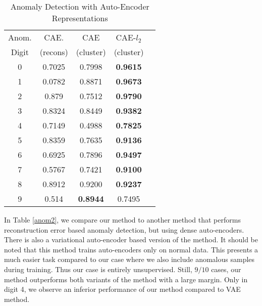 \documentclass[conference]{IEEEtran}
\begin{document}
\begin{table}[!t]

\caption{Anomaly Detection with Auto-Encoder Representations}
\label{anom}
\centering
\centering

\begin{adjustbox}{width=0.35\textwidth}

\begin{tabular}{|c|c|c|c|c|}
\hline
Anom.  & CAE. & CAE & CAE-$l_2$\\ 
Digit  & (recons) & (cluster) & (cluster)\\ 
\hline
0 &  0.7025 & 0.7998 & \textbf{0.9615} \\
\hline
1 &  0.0782 & 0.8871 & \textbf{0.9673}\\
\hline
2 &  0.879 & 0.7512 & \textbf{0.9790}\\
\hline
3 & 0.8324 & 0.8449 & \textbf{0.9382}\\
\hline
4 & 0.7149 & 0.4988 & \textbf{0.7825}\\
\hline
5 &  0.8359 & 0.7635 & \textbf{0.9136}\\
\hline
6 & 0.6925 & 0.7896 & \textbf{0.9497}\\
\hline
7 &  0.5767 & 0.7421 & \textbf{0.9100}\\
\hline
8 &  0.8912 & 0.9200 & \textbf{0.9237}\\
\hline
9 &  0.514 & \textbf{0.8944} & 0.7495\\
\hline
\end{tabular}
\end{adjustbox}
\end{table}


In Table \ref{anom2}, we compare our method to another method \cite{AVAE} that performs reconstruction error based anomaly detection, but using dense auto-encoders. 
There is also a variational auto-encoder based version of the method. 
It should be noted that this method trains auto-encoders only on normal data. 
This presents a much easier task compared to our case where we also include anomalous samples during training. 
Thus our case is entirely unsupervised.
Still, $9/10$ cases, our method outperforms both variants of the method with a large margin.
Only in digit 4, we observe an inferior performance of our method compared to VAE method. 
\end{document}

